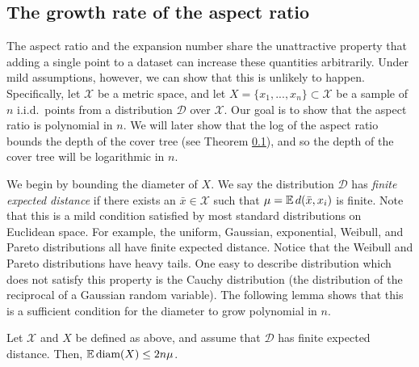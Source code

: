 \documentclass[../main.tex]{subfiles}
\newcommand{\set}[1]{\mathcal {#1}}
\newcommand{\distribution}[1]{\mathcal {#1}}
\newcommand{\dist}[2]{\distf({#1},{#2})}
\newcommand{\distf}{d}
\newcommand{\diam}[1]{\text{diam}({#1})}
\begin{document}
\subsection{The growth rate of the aspect ratio}

The aspect ratio and the expansion number share the unattractive property that adding a single point to a dataset can increase these quantities arbitrarily.
Under mild assumptions, however, we can show that this is unlikely to happen.
Specifically, let $\set X$ be a metric space, 
and let $X=\{x_1,...,x_n\}\subset\set X$ be a sample of $n$ i.i.d.\ points from a distribution $\distribution D$ over $\set X$.
Our goal is to show that the aspect ratio is polynomial in $n$.
We will later show that the log of the aspect ratio bounds the depth of the cover tree (see Theorem \ref{}),
and so the depth of the cover tree will be logarithmic in $n$.

We begin by bounding the diameter of $X$.
We say the distribution $\distribution D$ has \emph{finite expected distance} if there exists an $\bar x\in\set X$ such that $\mu=\E\dist{\bar x}{x_i}$ is finite.
Note that this is a mild condition satisfied by most standard distributions on Euclidean space.
For example, the uniform, Gaussian, exponential, Weibull, and Pareto distributions all have finite expected distance.
Notice that the Weibull and Pareto distributions have heavy tails.
One easy to describe distribution which does not satisfy this property is the Cauchy distribution 
(the distribution of the reciprocal of a Gaussian random variable).
The following lemma shows that this is a sufficient condition for the diameter to grow polynomial in $n$.

\begin{lemma}
    \label{lemma:Ediam}
    Let $\set X$ and $X$ be defined as above,
    and assume that $\distribution D$ has finite expected distance.
    Then, $\E\diam{X} \le 2n\mu$.
\end{lemma}
\end{document}
